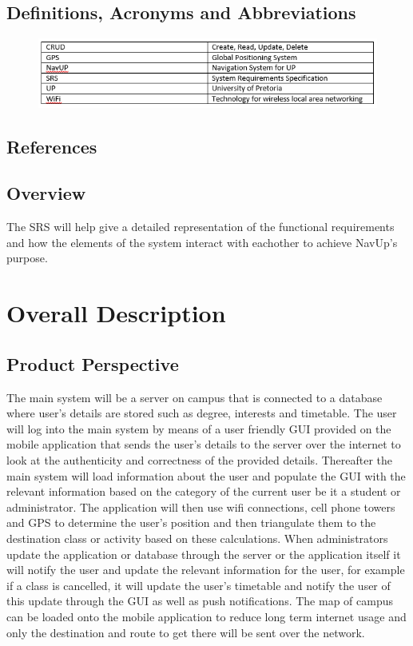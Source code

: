 \documentclass{article}
\begin{document}
	\subsection{Definitions, Acronyms and Abbreviations}
	
	\begin{figure}[h!]
		\includegraphics[scale=1]{Descriptions.PNG}
	\end{figure}
	
	\subsection{References}
	\subsection{Overview}
	The SRS will help give a detailed representation of the functional requirements and how the elements of the system interact with eachother to achieve NavUp's purpose. 
	
	\section{Overall Description}
	\subsection{Product Perspective}
		The main system will be a server on campus that is connected to a database where user's details are stored such as degree, interests and timetable. The user will log into the main system by means of a user friendly GUI provided on the mobile application that sends the user's details to the server over the internet to look at the authenticity and correctness of the provided details. Thereafter the main system will load information about the user and populate the GUI with the relevant information based on the category of the current user be it a student or administrator. The application will then use wifi connections, cell phone towers and GPS to determine the user's position and then triangulate them to the destination class or activity based on these calculations. When administrators update the application or database through the server or the application itself it will notify the user and update the relevant information for the user, for example if a class is cancelled, it will update the user's timetable and notify the user of this update through the GUI as well as push notifications. The map of campus can be loaded onto the mobile application to reduce long term internet usage and only the destination and route to get there will be sent over the network.
\end{document}
